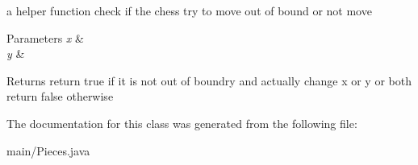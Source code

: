 a helper function check if the chess try to move out of bound or not move 
\begin{DoxyParams}{Parameters}
{\em x} & \\
\hline
{\em y} & \\
\hline
\end{DoxyParams}
\begin{DoxyReturn}{Returns}
return true if it is not out of boundry and actually change x or y or both return false otherwise 
\end{DoxyReturn}


The documentation for this class was generated from the following file\+:\begin{DoxyCompactItemize}
\item 
main/Pieces.\+java\end{DoxyCompactItemize}
